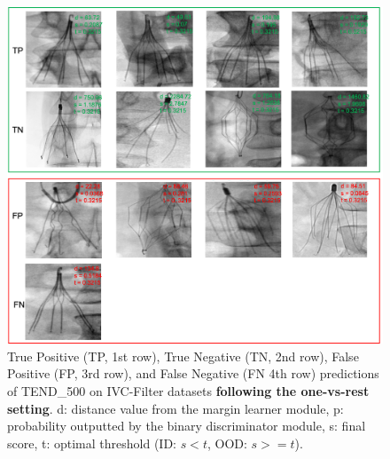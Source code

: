 \documentclass[12pt]{spieman}  %
\begin{document}
\begin{spacing}{2}
\begin{figure}[tp]
\begin{center}
  \includegraphics[width=\linewidth]{fig8.png}
\end{center}
  \caption{True Positive (TP, 1st row), True Negative (TN, 2nd row), False Positive (FP, 3rd row), and False Negative (FN 4th row) predictions of TEND\_500 on IVC-Filter datasets \textbf{following the one-vs-rest setting}. d: distance value from the margin learner module, p: probability outputted by the binary discriminator module, s: final score, t: optimal threshold (ID: $s<t$, OOD: $s>=t$).} 
\label{fig:ivc_cases}
\end{figure}

\clearpage




\end{spacing}
\end{document}
